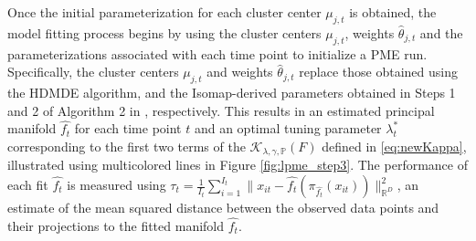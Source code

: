 \documentclass[12pt]{article}
\theoremstyle{definition}
\begin{document}
Once the initial parameterization for each cluster center $\mu_{j, t}$ is obtained, the model fitting process begins by using the cluster centers $\mu_{j, t}$, weights $\hat{\theta}_{j, t}$ and the parameterizations associated with each time point to initialize a PME run. Specifically, the cluster centers $\mu_{j, t}$ and weights $\hat{\theta}_{j, t}$ replace those obtained using the HDMDE algorithm, and the Isomap-derived parameters obtained in Steps 1 and 2 of Algorithm 2 in \cite{mengPrincipalManifoldEstimation2021}, respectively.
This results in an estimated principal manifold $\widehat{f_t}$ for each time point $t$ and an optimal tuning parameter $\lambda_t^*$ corresponding to the first two terms of the $\mathcal{K}_{\lambda, \gamma, \mathbb{P}}(F)$ defined in \eqref{eq:newKappa}, illustrated using multicolored lines in Figure \ref{fig:lpme_step3}. The performance of each fit $\widehat{f_t}$ is measured using $\tau_t = \frac{1}{I_t}\sum_{i=1}^{I_t}\| x_{it} - \widehat{f_t}(\pi_{\widehat{f_t}}(x_{it}))\|^{2}_{\mathbb{R}^D}$, an estimate of the mean squared distance between the observed data points and their projections to the fitted manifold $\widehat{f_t}$. 
\end{document}

